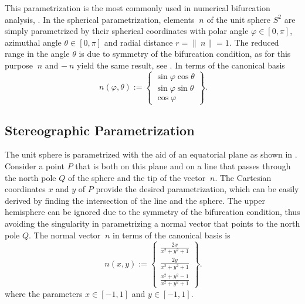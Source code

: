 \documentclass[12pt]{article}
\numberwithin{equation}{section}
\begin{document}
This parametrization is the most commonly used in numerical
bifurcation analysis, 
\eg \cite{Mosler:2005, Regueiro.Foster:2011, Andrade.Borja:2006, Springmann.etal:2009}.
In the spherical parametrization, elements $~n$ of the unit sphere
$S^2$ are simply parametrized by their spherical coordinates with
polar angle $\varphi \in [0, \pi]$, azimuthal angle $\theta \in [0,
  \pi]$ and radial distance $r = \|~n \| = 1$. The reduced range in
the angle $\theta$ is due to symmetry of the bifurcation condition, as
for this purpose $~n$ and $- ~n$ yield the same result, see
. In terms of the canonical basis
\begin{equation}
  ~n(\varphi, \theta)
  :=
  \begin{Bmatrix}
    \sin\varphi \cos\theta
    \\
    \sin\varphi \sin\theta
    \\
    \cos\varphi
  \end{Bmatrix}.
\end{equation}

\subsection{Stereographic Parametrization}
\label{subsec:stereographic}

The unit sphere is parametrized with the aid of an equatorial plane as
shown in .  Consider a point $P$ that is both
on this plane and on a line that passes through the north pole $Q$ of
the sphere and the tip of the vector $~n$. The Cartesian coordinates
$x$ and $y$ of $P$ provide the desired parametrization, which can be
easily derived by finding the intersection of the line and the
sphere. The upper hemisphere can be ignored due to the symmetry of the
bifurcation condition, thus avoiding the singularity in parametrizing
a normal vector that points to the north pole $Q$. The normal vector
$~n$ in terms of the canonical basis is
\begin{equation}
  ~n(x,y)
  :=
  \begin{Bmatrix}
    \frac{\displaystyle 2x}{\displaystyle x^2+y^2+1}
    \\[0.9em]
    \frac{\displaystyle 2y}{\displaystyle x^2+y^2+1}
    \\[0.9em]
    \frac{\displaystyle x^2+y^2-1}{\displaystyle x^2+y^2+1}
  \end{Bmatrix}.
\end{equation}
where the parameters $x \in [-1, 1]$ and $y \in [-1, 1]$.
\end{document}
